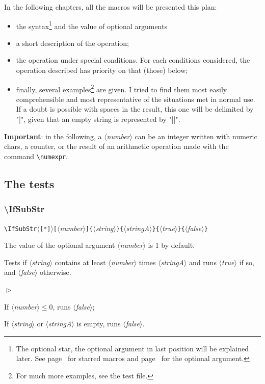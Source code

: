 \documentclass[english,a4paper,10pt]{article}
\newcommand\guill[1]{"#1"}
\newcommand\argu[1]{$\langle$\textit{#1}$\rangle$}
\newcommand\ARGU[1]{\texttt{\{}\argu{#1}\texttt{\}}}
\newcommand\arguC[1]{\texttt{[}\argu{#1}\texttt{]}}
\newcommand\etoile{$\langle$\texttt{[*]}$\rangle$}
\newenvironment{Conditions}[1][1cm]%
{\begin{list}%
	{$\vartriangleright$}%
	{\setlength{\leftmargin}{#1}
	 \setlength{\itemsep}{0pt}
	 \setlength{\parsep}{0pt}
	 \setlength{\topsep}{2ptplus3ptminus2pt}
	}}%
{\end{list}}
\begin{document}
In the following chapters, all the macros will be presented this plan:
\begin{itemize}
	\item the syntax\footnote{The optional star, the optional argument in last position will be explained later. See page~\pageref{macrosetoilees} for starred macros and  page~\pageref{argumentoptionnel} for the optional argument.} and the value of optional arguments
	\item a short description of the operation;
	\item the operation under special conditions. For each conditions considered, the operation described has priority on that (those) below;
	\item finally, several examples\footnote{For much more examples, see the test file.} are given. I tried to find them most easily comprehensible and most representative of the situations met in normal use. If a doubt is possible with spaces in the result, this one will be delimited by \guill{|}, given that an empty string is represented by \guill{||}.
\end{itemize}\smallskip

\textbf{Important}: in the following, a \argu{number} can be an integer written with numeric chars, a counter, or the result of an arithmetic operation made with the command \verb|\numexpr|.\smallskip

\subsection{The tests}
\subsubsection{\ttfamily\textbackslash IfSubStr}
\verb|\IfSubStr|\etoile\arguC{number}\ARGU{string}\ARGU{stringA}\ARGU{true}\ARGU{false}
\smallskip

The value of the optional argument \argu{number} is 1 by default.\par\smallskip

Tests if \argu{string} contains at least \argu{number} times \argu{stringA} and runs \argu{true} if so, and \argu{false} otherwise.\medskip

\begin{Conditions}
\item If \argu{number}${}\leqslant0$, runs \argu{false};
\item If \argu{string} or \argu{stringA} is empty, runs \argu{false}.
\end{Conditions}
\end{document}
